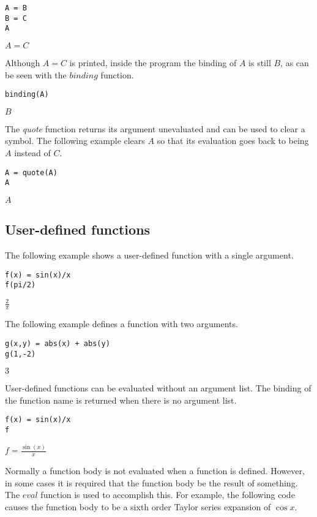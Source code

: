 \begin{Verbatim}[formatcom=\color{blue}]
A = B
B = C
A
\end{Verbatim}

$\displaystyle A=C$

Although $A=C$ is printed,
inside the program the binding of $A$ is still $B$, as can be seen with
the $binding$ function.

\begin{Verbatim}[formatcom=\color{blue}]
binding(A)
\end{Verbatim}

$\displaystyle B$

The {\it quote} function returns its argument unevaluated
and can be used to clear a symbol.
The following example clears $A$ so that its evaluation goes back to
being $A$ instead of $C$.

\begin{Verbatim}[formatcom=\color{blue}]
A = quote(A)
A
\end{Verbatim}

$\displaystyle A$

\subsection{User-defined functions}
The following example shows
a user-defined function with a single argument.

\begin{Verbatim}[formatcom=\color{blue}]
f(x) = sin(x)/x
f(pi/2)
\end{Verbatim}

$\displaystyle \frac{2}{\pi}$

The following example defines a function with two arguments.

\begin{Verbatim}[formatcom=\color{blue}]
g(x,y) = abs(x) + abs(y)
g(1,-2)
\end{Verbatim}

$\displaystyle 3$

User-defined functions can be evaluated without an argument list.
The binding of the function name is returned when there is no
argument list.

\begin{Verbatim}[formatcom=\color{blue}]
f(x) = sin(x)/x
f
\end{Verbatim}

$\displaystyle f=\frac{\sin(x)}{x}$

Normally a function body is not evaluated when a function is defined.
However, in some cases it is required that the function body be the
result of something.
The $eval$ function is used to accomplish this.
For example, the following code causes the function body to be a sixth order Taylor series expansion of $\cos x$.


